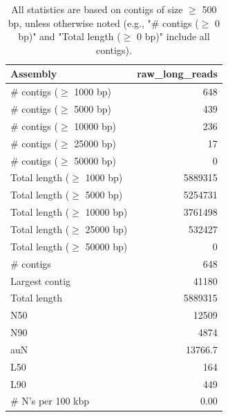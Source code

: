 \documentclass[12pt,a4paper]{article}
\begin{document}
\begin{table}[ht]
\begin{center}
\caption{All statistics are based on contigs of size $\geq$ 500 bp, unless otherwise noted (e.g., "\# contigs ($\geq$ 0 bp)" and "Total length ($\geq$ 0 bp)" include all contigs).}
\begin{tabular}{|l*{1}{|r}|}
\hline
Assembly & raw\_long\_reads \\ \hline
\# contigs ($\geq$ 1000 bp) & 648 \\ \hline
\# contigs ($\geq$ 5000 bp) & 439 \\ \hline
\# contigs ($\geq$ 10000 bp) & 236 \\ \hline
\# contigs ($\geq$ 25000 bp) & 17 \\ \hline
\# contigs ($\geq$ 50000 bp) & 0 \\ \hline
Total length ($\geq$ 1000 bp) & 5889315 \\ \hline
Total length ($\geq$ 5000 bp) & 5254731 \\ \hline
Total length ($\geq$ 10000 bp) & 3761498 \\ \hline
Total length ($\geq$ 25000 bp) & 532427 \\ \hline
Total length ($\geq$ 50000 bp) & 0 \\ \hline
\# contigs & 648 \\ \hline
Largest contig & 41180 \\ \hline
Total length & 5889315 \\ \hline
N50 & 12509 \\ \hline
N90 & 4874 \\ \hline
auN & 13766.7 \\ \hline
L50 & 164 \\ \hline
L90 & 449 \\ \hline
\# N's per 100 kbp & 0.00 \\ \hline
\end{tabular}
\end{center}
\end{table}
\end{document}
